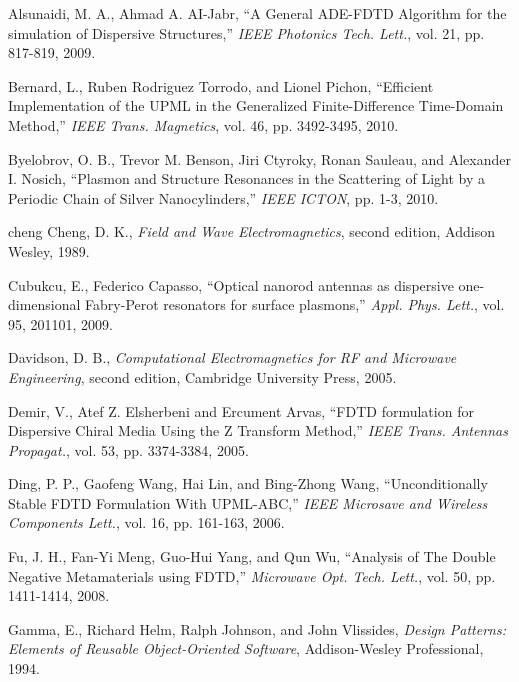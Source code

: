 \cleardoublepage
{}
\begin{thebibliography}{999}

  \bibitem
  {}
  Alsunaidi, M. A., Ahmad A. AI-Jabr,
  ``A General ADE-FDTD Algorithm for the simulation of Dispersive Structures,''
  \textit{IEEE Photonics Tech. Lett.},
  vol. 21,
  pp. 817-819,
  2009.

  \bibitem
  {}
  Bernard, L., Ruben Rodriguez Torrodo, and Lionel Pichon,
  ``Efficient Implementation of the UPML in the Generalized Finite-Difference Time-Domain Method,''
  \textit{IEEE Trans. Magnetics},
  vol. 46,
  pp. 3492-3495,
  2010.

  \bibitem
  {}
  Byelobrov, O. B., Trevor M. Benson, Jiri Ctyroky, Ronan Sauleau, and Alexander I. Nosich,
  ``Plasmon and Structure Resonances in the Scattering of Light by a Periodic Chain of Silver Nanocylinders,''
  \textit{IEEE ICTON},
  pp. 1-3,
  2010.

  \bibitem
  {cheng}
  Cheng, D. K.,
  \textit{Field and Wave Electromagnetics}, second edition,
  Addison Wesley,
  1989.

  \bibitem
  {}
  Cubukcu, E., Federico Capasso,
  ``Optical nanorod antennas as dispersive one-dimensional Fabry-Perot resonators for surface plasmons,''
  \textit{Appl. Phys. Lett.},
  vol. 95,
  201101,
  2009.

  \bibitem
  {}
  Davidson, D. B.,
  \textit{Computational Electromagnetics for RF and Microwave Engineering}, second edition,
  Cambridge University Press,
  2005.

  \bibitem
  {}
  Demir, V., Atef Z. Elsherbeni and Ercument Arvas,
  ``FDTD formulation for Dispersive Chiral Media Using the Z Transform Method,''
  \textit{IEEE Trans. Antennas Propagat.},
  vol. 53,
  pp. 3374-3384,
  2005.

  \bibitem
  {}
  Ding, P. P., Gaofeng Wang, Hai Lin, and Bing-Zhong Wang,
  ``Unconditionally Stable FDTD Formulation With UPML-ABC,''
  \textit{IEEE Microsave and Wireless Components Lett.},
  vol. 16,
  pp. 161-163,
  2006.

  \bibitem
  {}
  Fu, J. H., Fan-Yi Meng, Guo-Hui Yang, and Qun Wu,
  ``Analysis of The Double Negative Metamaterials using FDTD,''
  \textit{Microwave Opt. Tech. Lett.},
  vol. 50,
  pp. 1411-1414,
  2008.

  \bibitem
  {}
  Gamma, E., Richard Helm, Ralph Johnson, and John Vlissides,
  \textit{Design Patterns: Elements of Reusable Object-Oriented Software},
  Addison-Wesley Professional,
  1994.


\end{thebibliography}
